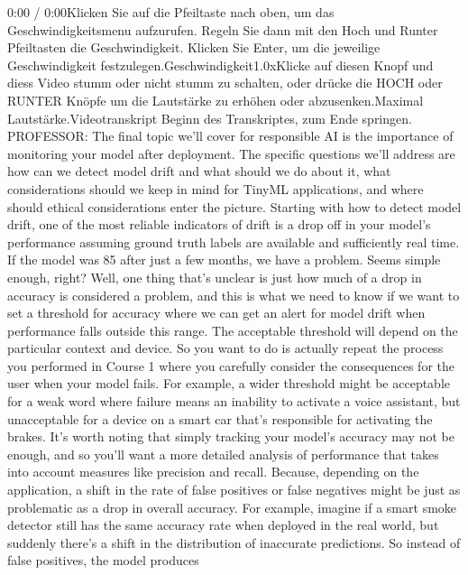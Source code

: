     0:00 / 0:00Klicken Sie auf die Pfeiltaste nach oben, um das Geschwindigkeitsmenu aufzurufen. Regeln Sie dann mit den Hoch und Runter Pfeiltasten die Geschwindigkeit. Klicken Sie Enter, um die jeweilige Geschwindigkeit festzulegen.Geschwindigkeit1.0xKlicke auf diesen Knopf und diess Video stumm oder nicht stumm zu schalten, oder drücke die HOCH oder RUNTER Knöpfe um die Lautstärke zu erhöhen oder abzusenken.Maximal Lautstärke.Videotranskript
    Beginn des Transkriptes, zum Ende springen.
    PROFESSOR: The final topic we'll cover for responsible AI is
    the importance of monitoring your model after deployment.
    The specific questions we'll address are how can we detect model drift
    and what should we do about it, what considerations should we
    keep in mind for TinyML applications, and where should ethical considerations
    enter the picture.
    Starting with how to detect model drift, one of the most reliable indicators
    of drift is a drop off in your model's performance
    assuming ground truth labels are available and sufficiently real time.
    If the model was 85%
    after just a few months, we have a problem.
    Seems simple enough, right?
    Well, one thing that's unclear is just how much of a drop in accuracy
    is considered a problem, and this is what
    we need to know if we want to set a threshold for accuracy where
    we can get an alert for model drift when performance falls outside this range.
    The acceptable threshold will depend on the particular context and device.
    So you want to do is actually repeat the process you performed in Course 1
    where you carefully consider the consequences for the user
    when your model fails.
    For example, a wider threshold might be acceptable for a weak word where
    failure means an inability to activate a voice assistant,
    but unacceptable for a device on a smart car that's
    responsible for activating the brakes.
    It's worth noting that simply tracking your model's accuracy
    may not be enough, and so you'll want a more detailed analysis of performance
    that takes into account measures like precision and recall.
    Because, depending on the application, a shift
    in the rate of false positives or false negatives
    might be just as problematic as a drop in overall accuracy.
    For example, imagine if a smart smoke detector still
    has the same accuracy rate when deployed in the real world,
    but suddenly there's a shift in the distribution of inaccurate predictions.
    So instead of false positives, the model produces
